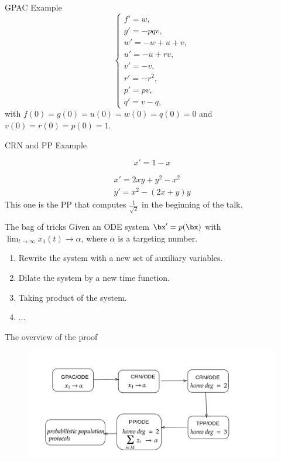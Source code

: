 \documentclass[aspectratio=169]{beamer}
\begin{document}
\begin{frame}{GPAC Example}
    \[
 \begin{cases}
    f'=w, \\
    g'=-pqv,\\
    w'=-w + u + v,\\
    u'=-u+rv,\\
    v'=-v, \\
    r'=-r^{2},\\
    p'=pv,\\
    q'=v-q,
\end{cases}
\]
with $f(0)=g(0)=u(0)=w(0)=q(0)=0$ and $v(0)=r(0)=p(0)=1$.
\end{frame}

\begin{frame}[Clean]{CRN and PP Example}
\begin{example}
\[
    x'= 1- x
\]
\end{example}
\begin{example}[PP/ODE]
    \begin{gather*}
            x' = 2xy + y^2 - x^2 \\
            y' = x^2 - (2x +y)y
   \end{gather*}
   This one is the PP that computes $\frac{1}{\sqrt{2}}$ in the beginning of the talk.
\end{example}
\end{frame}

\begin{frame}{The bag of tricks}
Given an ODE system $\bx'= p(\bx)$ with $\displaystyle\lim_{t\to \infty}x_1(t) \to \alpha $, where $\alpha$ is a targeting number.
    \begin{enumerate}
        \item Rewrite the system with a new set of auxiliary variables.
        \item Dilate the system by a new time function.
        \item Taking product of the system.
        \item  ...
    \end{enumerate}
\end{frame}
\begin{frame}{The overview of the proof}
    \begin{figure}[tb]
        \centering
        \includegraphics[scale=0.25]{flow-chart}
    \end{figure}
\end{frame}
\end{document}
